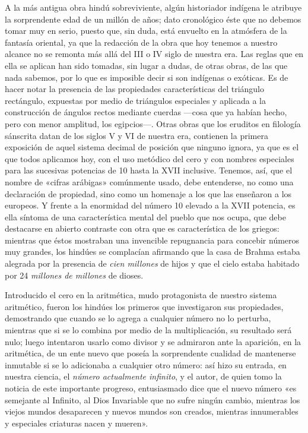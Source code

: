 \documentclass[a4paper, 12pt, draft]{article}
\begin{document}
{A la más antigua obra hindú sobreviviente, algún historiador indígena le atribuye la sorprendente edad de un millón de años; dato cronológico éste que no debemos tomar muy en serio, puesto que, sin duda, está envuelto en la atmósfera de la fantasía oriental, ya que la redacción de la obra que hoy tenemos a nuestro alcance no se remonta más allá del III o IV siglo de nuestra era. Las reglas que en ella se aplican han sido tomadas, sin lugar a dudas, de otras obras, de las que nada sabemos, por lo que es imposible decir si son indígenas o exóticas. Es de hacer notar la presencia de las propiedades características del triángulo rectángulo, expuestas por medio de triángulos especiales y aplicada a la construcción de ángulos rectos mediante cuerdas ---cosa que ya habían hecho, pero con menor amplitud, los egipcios---. Otras obras que los eruditos en filología sánscrita datan de los
siglos V y VI de nuestra era, contienen la primera exposición de aquel sistema decimal de posición que ninguno ignora, ya que es el que todos aplicamos hoy, con el uso metódico del cero y con nombres especiales para las sucesivas potencias de 10 hasta la XVII inclusive. Tenemos, así, que el nombre de «cifras arábigas» comúnmente usado, debe entenderse, no como una declaración de propiedad, sino como un homenaje a los que las enseñaron a los europeos. Y frente a la enormidad del número 10 elevado a la XVII potencia, es ella síntoma de una característica mental del pueblo que nos ocupa, que debe destacarse en abierto contraste con otra que es característica de los griegos: mientras que éstos mostraban una invencible repugnancia para concebir números muy grandes, los hindúes se complacían afirmando que la casa de Brahma estaba alegrada por la presencia de \textit{ cien millones} de hijos y que el cielo estaba  habitado por 24 \textit{ millones de millones} de dioses.

Introducido el cero en la aritmética, mudo protagonista de nuestro sistema aritmético, fueron los hindúes los primeros que investigaron sus propiedades, demostrando que cuando se lo agrega a cualquier número no lo perturba, mientras que si se lo combina por medio de la multiplicación, su resultado será nulo; luego intentaron usarlo como divisor y se admiraron ante la aparición, en la aritmética, de un ente nuevo que poseía la sorprendente cualidad de mantenerse inmutable si se lo adicionaba a cualquier otro número: así hizo su entrada, en nuestra ciencia, el \textit{ número actualmente infinito}, y el autor, de quien tomo la noticia de este importante progreso, entusiasmado dice que el nuevo número «es semejante al Infinito, al Dios Invariable que no sufre ningún cambio, mientras los viejos mundos desaparecen y nuevos mundos son creados, mientras innumerables y especiales criaturas nacen y mueren».


}
\end{document}
